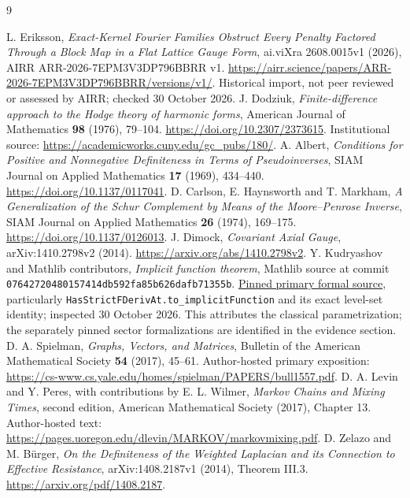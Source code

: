 \documentclass[11pt]{article}
\begin{document}
\begin{thebibliography}{9}
\raggedright
{} L. Eriksson, \emph{Exact-Kernel Fourier Families Obstruct
Every Penalty Factored Through a Block Map in a Flat Lattice Gauge Form},
ai.viXra 2608.0015v1 (2026), AIRR ARR-2026-7EPM3V3DP796BBRR v1.
\url{https://airr.science/papers/ARR-2026-7EPM3V3DP796BBRR/versions/v1/}.
Historical import, not peer reviewed or assessed by AIRR; checked 30 October 2026.
 J. Dodziuk, \emph{Finite-difference approach to the Hodge
theory of harmonic forms}, American Journal of Mathematics \textbf{98}
(1976), 79--104. \url{https://doi.org/10.2307/2373615}.
Institutional source: \url{https://academicworks.cuny.edu/gc_pubs/180/}.
 A. Albert, \emph{Conditions for Positive and Nonnegative
Definiteness in Terms of Pseudoinverses}, SIAM Journal on Applied Mathematics
\textbf{17} (1969), 434--440. \url{https://doi.org/10.1137/0117041}.
 D. Carlson, E. Haynsworth and T. Markham,
\emph{A Generalization of the Schur Complement by Means of the Moore--Penrose
Inverse}, SIAM Journal on Applied Mathematics \textbf{26} (1974), 169--175.
\url{https://doi.org/10.1137/0126013}.
 J. Dimock, \emph{Covariant Axial Gauge},
arXiv:1410.2798v2 (2014). \url{https://arxiv.org/abs/1410.2798v2}.
 Y. Kudryashov and Mathlib contributors,
\emph{Implicit function theorem}, Mathlib source at commit
\texttt{07642720480157414db592fa85b626dafb71355b}.
\href{https://github.com/leanprover-community/mathlib4/blob/07642720480157414db592fa85b626dafb71355b/Mathlib/Analysis/Calculus/Implicit.lean}{Pinned primary formal source},
particularly \texttt{HasStrictFDerivAt.to\_implicitFunction} and its exact
level-set identity; inspected 30 October 2026. This attributes the classical parametrization; the separately pinned sector formalizations are identified in the evidence section.
 D. A. Spielman, \emph{Graphs, Vectors, and Matrices},
Bulletin of the American Mathematical Society \textbf{54} (2017), 45--61.
Author-hosted primary exposition:
\url{https://cs-www.cs.yale.edu/homes/spielman/PAPERS/bull1557.pdf}.
 D. A. Levin and Y. Peres, with contributions by
E. L. Wilmer, \emph{Markov Chains and Mixing Times}, second edition,
American Mathematical Society (2017), Chapter 13.
Author-hosted text: \url{https://pages.uoregon.edu/dlevin/MARKOV/markovmixing.pdf}.
 D. Zelazo and M. B{\"u}rger,
\emph{On the Definiteness of the Weighted Laplacian and its Connection to
Effective Resistance}, arXiv:1408.2187v1 (2014), Theorem III.3.
\url{https://arxiv.org/pdf/1408.2187}.
\end{thebibliography}
\end{document}

